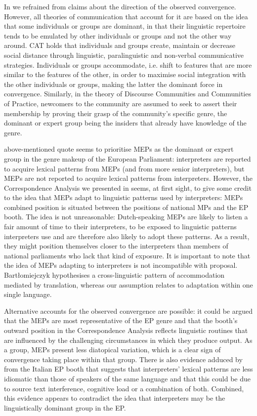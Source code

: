 \documentclass[output=paper]{langscibook}
\begin{document}
In \citet{DefrancqPlevoetsforthcoming} we refrained from claims about the direction of the observed convergence. However, all theories of communication that account for it are based on the idea that some individuals or groups are dominant, in that their linguistic repertoire tends to be emulated by other individuals or groups and not the other way around. CAT holds that individuals and groups create, maintain or decrease social distance through linguistic, paralinguistic and non-verbal communicative strategies. Individuals or groups accommodate, i.e. shift to features that are more similar to the features of the other, in order to maximise social integration with the other individuals or groups, making the latter the dominant force in convergence. Similarly, in the theory of Discourse Communities and Communities of Practice, newcomers to the community are assumed to seek to assert their membership by proving their grasp of the community’s specific genre, the dominant or expert group being the insiders that already have knowledge of the genre. 

 above-mentioned quote seems to prioritise MEPs as the dominant or expert group in the genre makeup of the European Parliament: interpreters are reported to acquire lexical patterns from MEPs (and from more senior interpreters), but MEPs are not reported to acquire lexical patterns from interpreters. However, the Correspondence Analysis we presented in \citet{DefrancqPlevoetsforthcoming} seems, at first sight, to give some credit to the idea that MEPs adapt to linguistic patterns used by interpreters: MEPs combined position is situated between the positions of national MPs and the EP booth. The idea is not unreasonable: Dutch-speaking MEPs are likely to listen a fair amount of time to their interpreters, to be exposed to linguistic patterns interpreters use and are therefore also likely to adopt these patterns. As a result, they might position themselves closer to the interpreters than members of national parliaments who lack that kind of exposure. It is important to note that the idea of MEPs adapting to interpreters is not incompatible with  proposal. Bartłomiejczyk hypothesises a cross-linguistic pattern of accommodation mediated by translation, whereas our assumption relates to adaptation within one single language.  

Alternative accounts for the observed convergence are possible: it could be argued that the MEPs are most representative of the EP genre and that the booth’s outward position in the Correspondence Analysis reflects linguistic routines that are influenced by the challenging circumstances in which they produce output. As a group, MEPs present less diatopical variation, which is a clear sign of convergence taking place within that group. There is also evidence adduced by \citet{FerraresiMilicevic2017} from the Italian EP booth that suggests that interpreters’ lexical patterns are less idiomatic than those of speakers of the same language and that this could be due to source text interference, cognitive load or a combination of both. Combined, this evidence appears to contradict the idea that interpreters may be the linguistically dominant group in the EP. 
\end{document}
